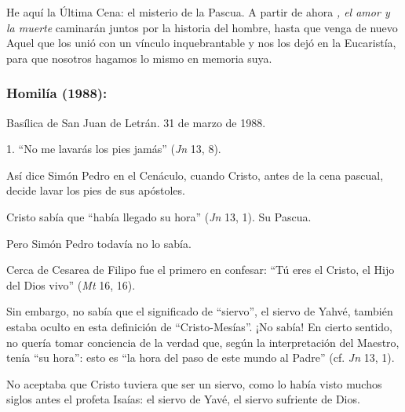 			\begin{body}He aquí la Última Cena: el misterio de la Pascua. A partir de ahora \textit{, el amor y la muerte} caminarán juntos por la historia del hombre, hasta que venga de nuevo Aquel que los unió con un vínculo inquebrantable y nos los dejó en la Eucaristía, para que nosotros hagamos lo mismo en memoria suya.\end{body}
			
			\subsubsection{Homilía (1988): }
			
			\begin{referencia}Basílica de San Juan de Letrán. 31 de marzo de 1988.\end{referencia}
			
			\begin{body} 1. “No me lavarás los pies jamás” (\textit{Jn} 13, 8). \end{body}
			
			\begin{body}Así dice Simón Pedro en el Cenáculo, cuando Cristo, antes de la cena pascual, decide lavar los pies de sus apóstoles. \end{body}
			
			\begin{body}Cristo sabía que “había llegado su hora” (\textit{Jn} 13, 1). Su Pascua. \end{body}
			
			\begin{body}Pero Simón Pedro todavía no lo sabía. \end{body}
			
			\begin{body}Cerca de Cesarea de Filipo fue el primero en confesar: “Tú eres el Cristo, el Hijo del Dios vivo” (\textit{Mt }16, 16). \end{body}
			
			\begin{body}Sin embargo, no sabía que el significado de “siervo”, el siervo de Yahvé, también estaba oculto en esta definición de “Cristo-Mesías”. ¡No sabía! En cierto sentido, no quería tomar conciencia de la verdad que, según la interpretación del Maestro, tenía “su hora”: esto es “la hora del paso de este mundo al Padre” (cf. \textit{Jn} 13, 1). \end{body}
			
			\begin{body}No aceptaba que Cristo tuviera que ser un siervo, como lo había visto muchos siglos antes el profeta Isaías: el siervo de Yavé, el siervo sufriente de Dios. \end{body}
			
